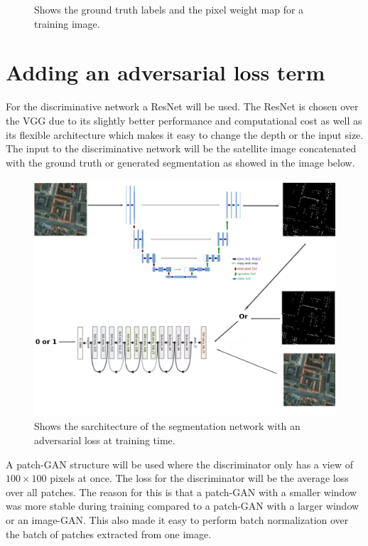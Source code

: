 \documentclass{kththesis}
\begin{document}
\begin{figure}[H]
\endminipage\hfill
\caption{Shows the ground truth labels and the pixel weight map for a training image.}
\end{figure}
\section{Adding an adversarial loss term}
For the discriminative network a ResNet will be used. The ResNet is chosen over the VGG due to its slightly better performance and computational cost \parencite{johnson_cnn-benchmarks:_2018} as well as its flexible architecture which makes it easy to change the depth or the input size. The input to the discriminative network will be the satellite image concatenated with the ground truth or generated segmentation as showed in the image below. 
\begin{figure}[H]
  \centering
      \includegraphics[scale=0.25]{gan_no_n}
  \caption{Shows the sarchitecture of the segmentation network with an adversarial loss at training time.} \label{fig:GAN}
\end{figure}
\noindent A patch-GAN structure will be used where the discriminator only has a view of $100 \times 100$ pixels at once. The loss for the discriminator will be the average loss over all patches. The reason for this is that a patch-GAN with a smaller window was more stable during training compared to a patch-GAN with a larger window or an image-GAN. This also made it easy to perform batch normalization over the batch of patches extracted from one image.\\
\end{document}

